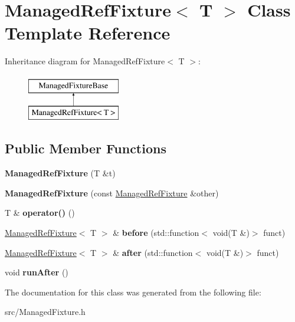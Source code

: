 \hypertarget{class_managed_ref_fixture}{\section{Managed\-Ref\-Fixture$<$ T $>$ Class Template Reference}
\label{class_managed_ref_fixture}
}
Inheritance diagram for Managed\-Ref\-Fixture$<$ T $>$\-:\begin{figure}[H]
\begin{center}
\leavevmode
\includegraphics[height=2.000000cm]{class_managed_ref_fixture}
\end{center}
\end{figure}
\subsection*{Public Member Functions}
\begin{DoxyCompactItemize}
\item 
\hypertarget{class_managed_ref_fixture_a40f44a7a01d0ccaae1f8d069a2295f6e}{{\bfseries Managed\-Ref\-Fixture} (T \&t)}\label{class_managed_ref_fixture_a40f44a7a01d0ccaae1f8d069a2295f6e}

\item 
\hypertarget{class_managed_ref_fixture_a70938504412dcb1e3eac465369e483ef}{{\bfseries Managed\-Ref\-Fixture} (const \hyperlink{class_managed_ref_fixture}{Managed\-Ref\-Fixture} \&other)}\label{class_managed_ref_fixture_a70938504412dcb1e3eac465369e483ef}

\item 
\hypertarget{class_managed_ref_fixture_ae45e80c03c99d0afcf4b9fc46a756bee}{T \& {\bfseries operator()} ()}\label{class_managed_ref_fixture_ae45e80c03c99d0afcf4b9fc46a756bee}

\item 
\hypertarget{class_managed_ref_fixture_a21ac3820095a9e7796980c874d94a5fa}{\hyperlink{class_managed_ref_fixture}{Managed\-Ref\-Fixture}$<$ T $>$ \& {\bfseries before} (std\-::function$<$ void(T \&)$>$ funct)}\label{class_managed_ref_fixture_a21ac3820095a9e7796980c874d94a5fa}

\item 
\hypertarget{class_managed_ref_fixture_a4bb40c5a85538480f035a74badb70e8b}{\hyperlink{class_managed_ref_fixture}{Managed\-Ref\-Fixture}$<$ T $>$ \& {\bfseries after} (std\-::function$<$ void(T \&)$>$ funct)}\label{class_managed_ref_fixture_a4bb40c5a85538480f035a74badb70e8b}

\item 
\hypertarget{class_managed_ref_fixture_ade762c90d081b4cd0db5c8c8f1427153}{void {\bfseries run\-After} ()}\label{class_managed_ref_fixture_ade762c90d081b4cd0db5c8c8f1427153}

\end{DoxyCompactItemize}


The documentation for this class was generated from the following file\-:\begin{DoxyCompactItemize}
\item 
src/Managed\-Fixture.\-h\end{DoxyCompactItemize}

